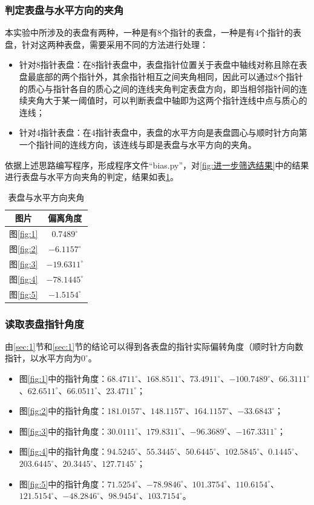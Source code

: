 \documentclass[a4paper]{ctexart}
\begin{document}
\subsubsection{判定表盘与水平方向的夹角}\label{sec:2}
本实验中所涉及的表盘有两种，一种是有8个指针的表盘，一种是有4个指针的表盘，针对这两种表盘，需要采用不同的方法进行处理：
\begin{itemize}
	\item 针对8指针表盘：在8指针表盘中，表盘指针位置关于表盘中轴线对称且除在表盘最底部的两个指针外，其余指针相互之间夹角相同，因此可以通过8个指针的质心与指针各自的质心之间的连线夹角判定表盘方向，即当相邻指针间的连续夹角大于某一阈值时，可以判断表盘中轴即为这两个指针连线中点与质心的连线；
	\item 针对4指针表盘：在4指针表盘中，表盘的水平方向是表盘圆心与顺时针方向第一个指针间的连线方向，该连线与即是表盘与水平方向的夹角。
\end{itemize}
依据上述思路编写程序，形成程序文件“bias.py”，对\ref{fig:进一步筛选结果}中的结果进行表盘与水平方向夹角的判定，结果如表\ref{tbl:表盘与水平方向夹角}。
\begin{table}
	\centering
	\caption{表盘与水平方向夹角}\label{tbl:表盘与水平方向夹角}
	\begin{tabular}{|c|c|}
		\hline
		图片&偏离角度\\
		\hline
		图\ref{fig:1}&$0.7489^\circ$\\
		图\ref{fig:2}&$-6.1157^\circ$\\
		图\ref{fig:3}&$-19.6311^\circ$\\
		图\ref{fig:4}&$-78.1445^\circ$\\
		图\ref{fig:5}&$-1.5154^\circ$\\
		\hline
	\end{tabular}
\end{table}

\subsubsection{读取表盘指针角度}
由\ref{sec:1}节和\ref{sec:1}节的结论可以得到各表盘的指针实际偏转角度（顺时针方向数指针，以水平方向为$0^\circ$。
\begin{itemize}
	\item 图\ref{fig:1}中的指针角度：$68.4711^\circ$、$168.8511^\circ$、$73.4911^\circ$、$-100.7489^\circ$、$66.3111^\circ$、$62.6511^\circ$、$66.0511^\circ$、$23.4711^\circ$；
	\item 图\ref{fig:2}中的指针角度：$181.0157^\circ$、$148.1157^\circ$、$164.1157^\circ$、$-33.6843^\circ$；
	\item 图\ref{fig:3}中的指针角度：$30.0111^\circ$、$179.8311^\circ$、$-96.3689^\circ$、$-167.3311^\circ$；
	\item 图\ref{fig:4}中的指针角度：$94.5245^\circ$、$55.3445^\circ$、$50.6445^\circ$、$102.5845^\circ$、$0.1445^\circ$、$203.6445^\circ$、$20.3445^\circ$、$127.7145^\circ$；
	\item 图\ref{fig:5}中的指针角度：$71.5254^\circ$、$-78.9846^\circ$、$101.3754^\circ$、$110.6154^\circ$、$121.5154^\circ$、$-48.2846^\circ$、$98.9454^\circ$、$103.7154^\circ$。
\end{itemize}
\end{document}
